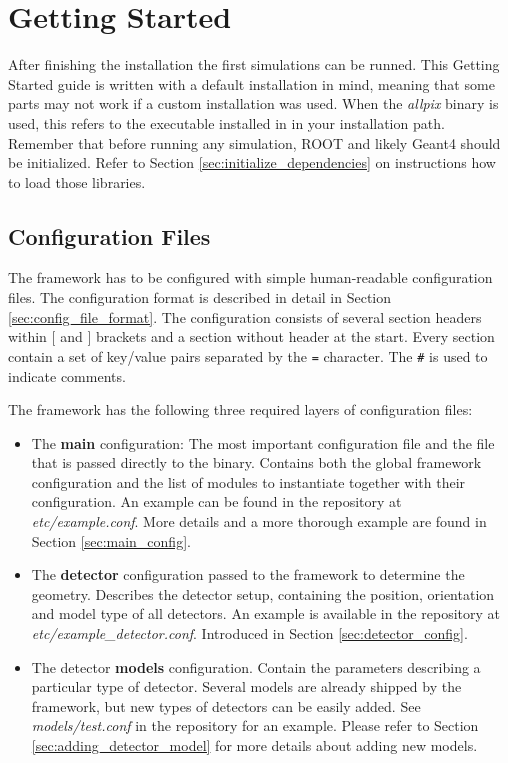 \section{Getting Started}
After finishing the installation the first simulations can be runned. This Getting Started guide is written with a default installation in mind, meaning that some parts may not work if a custom installation was used. When the \textit{allpix} binary is used, this refers to the executable installed in  in your installation path. Remember that before running any \apsq simulation, ROOT and likely Geant4 should be initialized. Refer to Section \ref{sec:initialize_dependencies} on instructions how to load those libraries.

\subsection{Configuration Files}
\label{sec:configuration_files}
The framework has to be configured with simple human-readable configuration files. The configuration format is described in detail in Section \ref{sec:config_file_format}. The configuration consists of several section headers within $[$ and $]$ brackets and a section without header at the start. Every section contain a set of key/value pairs separated by the \texttt{=} character. The \texttt{\#} is used to indicate comments.

The framework has the following three required layers of configuration files:
\begin{itemize}
\item The \textbf{main} configuration: The most important configuration file and the file that is passed directly to the binary. Contains both the global framework configuration and the list of modules to instantiate together with their configuration. An example can be found in the repository at \textit{etc/example.conf}. More details and a more thorough example are found in Section \ref{sec:main_config}.
\item The \textbf{detector} configuration passed to the framework to determine the geometry. Describes the detector setup, containing the position, orientation and model type of all detectors. An example is available in the repository at \textit{etc/example\_detector.conf}. Introduced in Section \ref{sec:detector_config}.
\item The detector \textbf{models} configuration. Contain the parameters describing a particular type of detector. Several models are already shipped by the framework, but new types of detectors can be easily added. See \textit{models/test.conf} in the repository for an example. Please refer to Section \ref{sec:adding_detector_model} for more details about adding new models.
\end{itemize}

